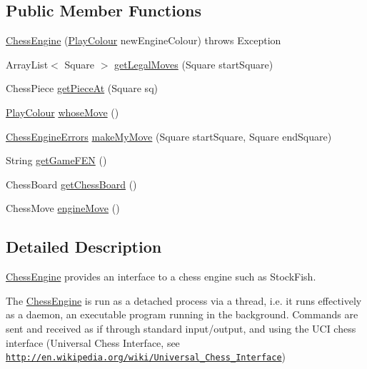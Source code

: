 \subsection*{Public Member Functions}
\begin{DoxyCompactItemize}
\item 
\hyperlink{classswantech_1_1_chess_engine_a206b7f60195b050af7bf73124a359bd5}{Chess\+Engine} (\hyperlink{enumswantech_1_1_play_colour}{Play\+Colour} new\+Engine\+Colour)  throws Exception     
\item 
Array\+List$<$ Square $>$ \hyperlink{classswantech_1_1_chess_engine_a529858ea407075c6a4daf04d5b3dd51e}{get\+Legal\+Moves} (Square start\+Square)
\item 
Chess\+Piece \hyperlink{classswantech_1_1_chess_engine_ad09f3dd52a728a42cdb1515e7104f03e}{get\+Piece\+At} (Square sq)
\item 
\hyperlink{enumswantech_1_1_play_colour}{Play\+Colour} \hyperlink{classswantech_1_1_chess_engine_ae6976be646e833558d31d2e3bf242773}{whose\+Move} ()
\item 
\hyperlink{enumswantech_1_1_chess_engine_errors}{Chess\+Engine\+Errors} \hyperlink{classswantech_1_1_chess_engine_a0e8106f504de2a1cec26d523865c3d02}{make\+My\+Move} (Square start\+Square, Square end\+Square)
\item 
String \hyperlink{classswantech_1_1_chess_engine_a06277d63732bbc472ad1a61e0f5e5ae8}{get\+Game\+F\+E\+N} ()
\item 
Chess\+Board \hyperlink{classswantech_1_1_chess_engine_aff2e5a7749c5e48afdbe544b879454fa}{get\+Chess\+Board} ()
\item 
Chess\+Move \hyperlink{classswantech_1_1_chess_engine_a4e2edbbc872baf9bd0f180a132090584}{engine\+Move} ()
\end{DoxyCompactItemize}


\subsection{Detailed Description}
\hyperlink{classswantech_1_1_chess_engine}{Chess\+Engine} provides an interface to a chess engine such as Stock\+Fish. 

The \hyperlink{classswantech_1_1_chess_engine}{Chess\+Engine} is run as a detached process via a thread, i.\+e. it runs effectively as a daemon, an executable program running in the background. Commands are sent and received as if through standard input/output, and using the U\+C\+I chess interface (Universal Chess Interface, see \href{http://en.wikipedia.org/wiki/Universal_Chess_Interface}{\tt http\+://en.\+wikipedia.\+org/wiki/\+Universal\+\_\+\+Chess\+\_\+\+Interface}) 

